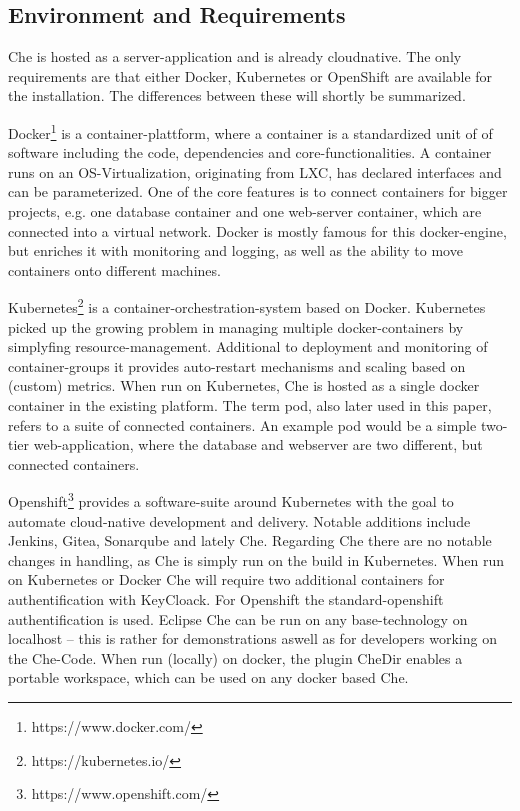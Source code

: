 \documentclass[utf8]{lni}
\begin{document}
\subsection{Environment and Requirements}
\label{subsec:Req}
Che is hosted as a server-application and is already cloudnative. 
The only requirements are that either Docker, Kubernetes or OpenShift are available for the installation.
The differences between these will shortly be summarized.
 
Docker\footnote{https://www.docker.com/} is a container-plattform, where a container is a standardized unit of of software including the code, dependencies and core-functionalities. 
A container runs on an OS-Virtualization, originating from LXC, has declared interfaces and can be parameterized. 
One of the core features is to connect containers for bigger projects, e.g. one 
database container and one web-server container, which are connected into a virtual network. 
Docker is mostly famous for this docker-engine, but enriches it with monitoring and logging, as well as the ability to move containers onto different machines.   

Kubernetes\footnote{https://kubernetes.io/} is a container-orchestration-system based on Docker. 
Kubernetes picked up the growing problem in managing multiple docker-containers by  simplyfing  resource-management. 
Additional to deployment and monitoring of container-groups it provides auto-restart mechanisms and scaling based on (custom) metrics. 
When run on Kubernetes, Che is hosted as a single docker container in the existing platform.
The term pod, also later used in this paper, refers to a suite of connected containers. 
An example pod would be a simple two-tier web-application, where the database and webserver are two different, but connected containers.

Openshift\footnote{https://www.openshift.com/} provides a software-suite around Kubernetes with the goal to automate cloud-native development and delivery.
Notable  additions  include  Jenkins,  Gitea,  Sonarqube and lately Che. 
Regarding Che there are no notable changes in handling, as Che is simply run on the build in Kubernetes.
When run on Kubernetes or Docker Che will require two additional containers for authentification with KeyCloack. 
For Openshift the standard-openshift authentification is used.  
Eclipse Che  can be run  on any  base-technology  on  localhost – this is rather for demonstrations aswell as for developers working on the Che-Code. 
When run (locally) on docker, the plugin CheDir enables a portable workspace, 
which can be used on any docker based Che.
\end{document}
